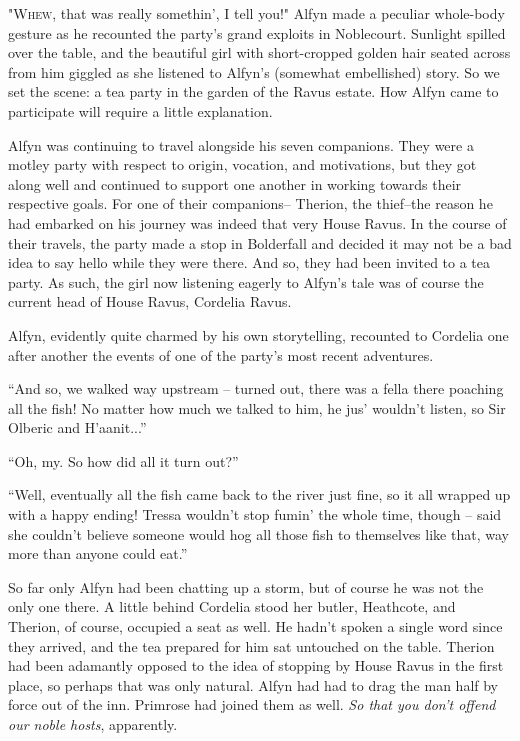 "\textsc{Whew,} that was really somethin', I tell you!" Alfyn made a peculiar whole-body gesture as he recounted the party's grand exploits in Noblecourt. Sunlight spilled over the table, and the beautiful girl with short-cropped golden hair seated across from him giggled as she listened to Alfyn's (somewhat embellished) story. So we set the scene: a tea party in the garden of the Ravus estate. How Alfyn came to participate will require a little explanation.

Alfyn was continuing to travel alongside his seven companions. They were a motley party with respect to origin, vocation, and motivations, but they got along well and continued to support one another in working towards their respective goals. For one of their companions-- Therion, the thief--the reason he had embarked on his journey was indeed that very House Ravus. In the course of their travels, the party made a stop in Bolderfall and decided it may not be a bad idea to say hello while they were there. And so, they had been invited to a tea party. As such, the girl now listening eagerly to Alfyn's tale was of course the current head of House Ravus, Cordelia Ravus. 

Alfyn, evidently quite charmed by his own storytelling, recounted to Cordelia one after another the events of one of the party's most recent adventures.

``And so, we walked way upstream -- turned out, there was a fella there poaching all the fish! No matter how much we talked to him, he jus' wouldn't listen, so Sir Olberic and H'aanit...''

``Oh, my. So how did all it turn out?''

``Well, eventually all the fish came back to the river just fine, so it all wrapped up with a happy ending! Tressa wouldn't stop fumin' the whole time, though -- said she couldn't believe someone would hog all those fish to themselves like that, way more than anyone could eat.''

So far only Alfyn had been chatting up a storm, but of course he was not the only one there. A little behind Cordelia stood her butler, Heathcote, and Therion, of course, occupied a seat as well. He hadn't spoken a single word since they arrived, and the tea prepared for him sat untouched on the table. Therion had been adamantly opposed to the idea of stopping by House Ravus in the first place, so perhaps that was only natural. Alfyn had had to drag the man half by force out of the inn. Primrose had joined them as well. \emph{So that you don't offend our noble hosts}, apparently.

